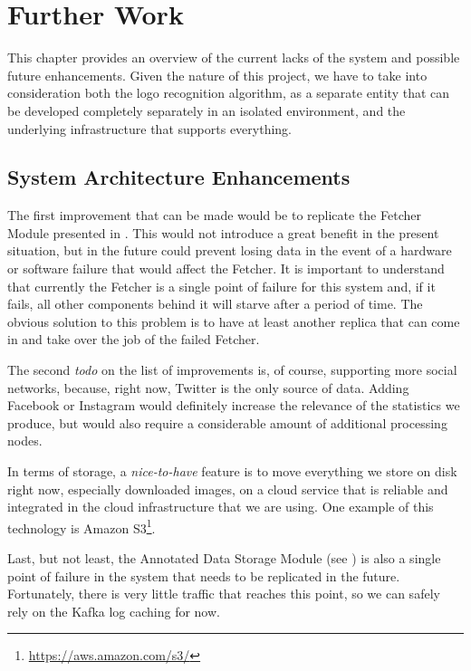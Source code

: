 \chapter{Further Work}

This chapter provides an overview of the current lacks of the system and
possible future enhancements. Given the nature of this project, we have to take into
consideration both the logo recognition algorithm, as a separate entity that
can be developed completely separately in an isolated environment, and the
underlying infrastructure that supports everything.

\section{System Architecture Enhancements}

The first improvement that can be made would be to replicate the Fetcher
Module presented in . This would
not introduce a great benefit in the present situation, but in the future
could prevent losing data in the event of a hardware or software failure that
would affect the Fetcher. It is important to understand that currently the
Fetcher is a single point of failure for this system and, if it fails, all
other components behind it will starve after a period of time. The obvious
solution to this problem is to have at least another replica that can come in and
take over the job of the failed Fetcher.

The second \textit{todo} on the list of improvements is, of course, supporting
more social networks, because, right now, Twitter is the only source of data.
Adding Facebook or Instagram would definitely increase the relevance of the
statistics we produce, but would also require a considerable amount of
additional processing nodes.

In terms of storage, a \textit{nice-to-have} feature is to move everything we
store on disk right now, especially downloaded images, on a cloud service that
is reliable and integrated in the cloud infrastructure that we are using. One
example of this technology is Amazon
S3\footnote{\url{https://aws.amazon.com/s3/}}.

Last, but not least, the Annotated Data Storage Module (see
) is also a single point of failure
in the system that needs to be replicated in the future. Fortunately, there is
very little traffic that reaches this point, so we can safely rely on the
Kafka log caching for now.

